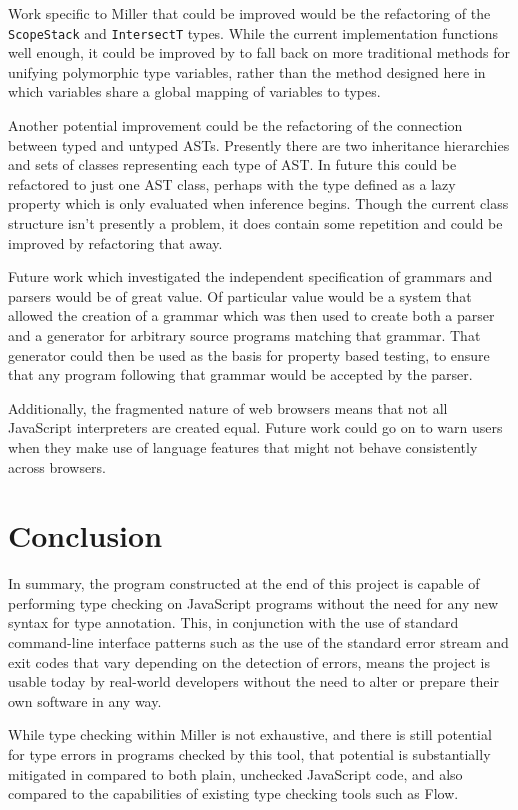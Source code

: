 \documentclass[british, twoside, openright]{bhamthesis}
\theoremstyle{definition}
\begin{document}
    Work specific to Miller that could be improved would be the refactoring of the \texttt{ScopeStack} and \texttt{IntersectT} types. While the current implementation functions well enough, it could be improved by to fall back on more traditional methods for unifying polymorphic type variables, rather than the method designed here in which variables share a global mapping of variables to types.

    Another potential improvement could be the refactoring of the connection between typed and untyped ASTs. Presently there are two inheritance hierarchies and sets of classes representing each type of AST. In future this could be refactored to just one AST class, perhaps with the type defined as a lazy property which is only evaluated when inference begins. Though the current class structure isn't presently a problem, it does contain some repetition and could be improved by refactoring that away.

    Future work which investigated the independent specification of grammars and parsers would be of great value. Of particular value would be a system that allowed the creation of a grammar which was then used to create both a parser and a generator for arbitrary source programs matching that grammar. That generator could then be used as the basis for property based testing, to ensure that any program following that grammar would be accepted by the parser.

    Additionally, the fragmented nature of web browsers means that not all JavaScript interpreters are created equal. Future work could go on to warn users when they make use of language features that might not behave consistently across browsers.

\chapter{Conclusion}

  In summary, the program constructed at the end of this project is capable of performing type checking on JavaScript programs without the need for any new syntax for type annotation. This, in conjunction with the use of standard command-line interface patterns such as the use of the standard error stream and exit codes that vary depending on the detection of errors, means the project is usable today by real-world developers without the need to alter or prepare their own software in any way.

  While type checking within Miller is not exhaustive, and there is still potential for type errors in programs checked by this tool, that potential is substantially mitigated in compared to both plain, unchecked JavaScript code, and also compared to the capabilities of existing type checking tools such as Flow.
\end{document}
